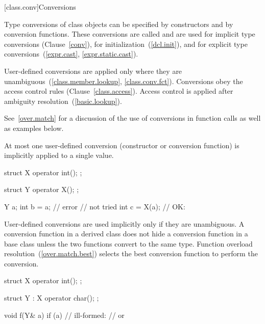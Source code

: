 [class.conv]{Conversions}

\pnum
{}%
%
%
%
%
Type conversions of class objects can be specified by constructors and
by conversion functions.
These conversions are called
and are used for implicit type conversions (Clause~\ref{conv}),
for initialization~(\ref{dcl.init}),
and for explicit type conversions~(\ref{expr.cast}, \ref{expr.static.cast}).

\pnum
User-defined conversions are applied only where they are unambiguous~(\ref{class.member.lookup}, \ref{class.conv.fct}).
Conversions obey the access control rules (Clause~\ref{class.access}).
Access control is applied after ambiguity resolution~(\ref{basic.lookup}).

\pnum
\begin{note}
See~\ref{over.match} for a discussion of the use of conversions in function calls
as well as examples below.
\end{note}

\pnum
{}%
At most one user-defined conversion (constructor or conversion function)
is implicitly applied to a single value.

\begin{example}

\begin{codeblock}
struct X {
  operator int();
};

struct Y {
  operator X();
};

Y a;
int b = a;          // error
                    //  not tried
int c = X(a);       // OK: 
\end{codeblock}
\end{example}

\pnum
User-defined conversions are used implicitly only if they are unambiguous.
%
A conversion function in a derived class does not hide a conversion function
in a base class unless the two functions convert to the same type.
Function overload resolution~(\ref{over.match.best}) selects the best
conversion function to perform the conversion.
\begin{example}

\begin{codeblock}
struct X {
  operator int();
};

struct Y : X {
    operator char();
};

void f(Y& a) {
  if (a) {          // ill-formed:
                    //  or 
  }
}
\end{codeblock}
\end{example}

